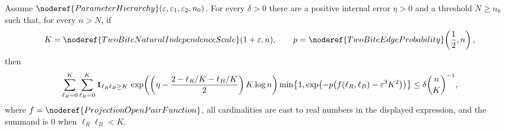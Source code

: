\begin{helper}
Assume \(\noderef{ParameterHierarchy}(\varepsilon,\varepsilon_1,\varepsilon_2,n_0)\).
For every \(\delta>0\) there are a positive internal error \(\eta>0\) and
a threshold \(N\ge n_0\) such that, for every \(n>N\), if
\[
K=\noderef{TwoBiteNaturalIndependenceScale}(1+\varepsilon,n),
\qquad
p=\noderef{TwoBiteEdgeProbability}\!\left(\frac12,n\right),
\]
then
\[
\sum_{\ell_R=0}^{K}\sum_{\ell_B=0}^{K}
{\bf 1}_{\ell_R\ell_B\ge K}\,
\exp\!\left(
\left(\eta-\frac{2-\ell_R/K-\ell_B/K}{2}\right)K\log n
\right)
\min\!\left\{1,
\exp\!\left(-p\bigl(f(\ell_R,\ell_B)-\varepsilon^3K^2\bigr)\right)
\right\}
\le
\delta\binom nK^{-1},
\]
where \(f=\noderef{ProjectionOpenPairFunction}\), all cardinalities are cast to
real numbers in the displayed expression, and the summand is \(0\) when
\(\ell_R\ell_B<K\).
\end{helper}
